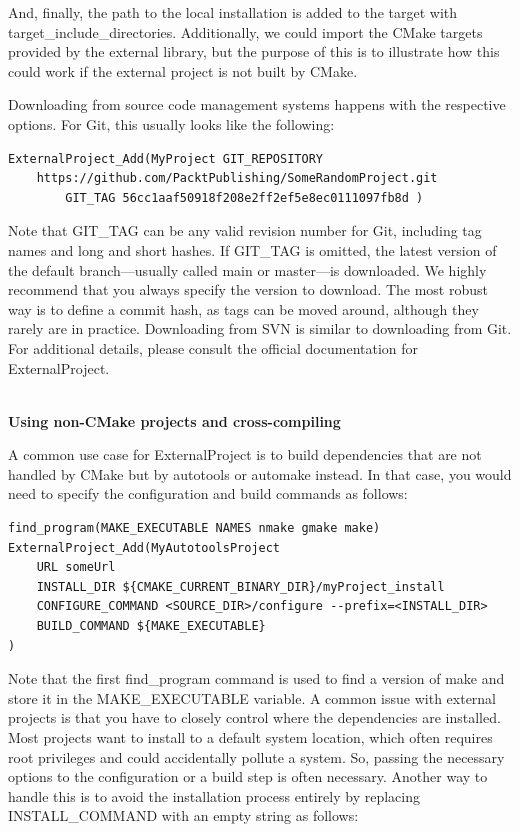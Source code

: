 And, finally, the path to the local installation is added to the target with target\_include\_directories. Additionally, we could import the CMake targets provided by the external library, but the purpose of this is to illustrate how this could work if the external project is not built by CMake.

Downloading from source code management systems happens with the respective options. For Git, this usually looks like the following:

\begin{lstlisting}[style=styleCMake]
ExternalProject_Add(MyProject GIT_REPOSITORY
	https://github.com/PacktPublishing/SomeRandomProject.git
		GIT_TAG 56cc1aaf50918f208e2ff2ef5e8ec0111097fb8d )
\end{lstlisting}

Note that GIT\_TAG can be any valid revision number for Git, including tag names and long and short hashes. If GIT\_TAG is omitted, the latest version of the default branch—usually called main or master—is downloaded. We highly recommend that you always specify the version to download. The most robust way is to define a commit hash, as tags can be moved around, although they rarely are in practice. Downloading from SVN is similar to downloading from Git. For additional details, please consult the official documentation for ExternalProject.

\hspace*{\fill} \\ %
\noindent
\textbf{Using non-CMake projects and cross-compiling}

A common use case for ExternalProject is to build dependencies that are not handled by CMake but by autotools or automake instead. In that case, you would need to specify the configuration and build commands as follows:

\begin{lstlisting}[style=styleCMake]
find_program(MAKE_EXECUTABLE NAMES nmake gmake make)
ExternalProject_Add(MyAutotoolsProject
	URL someUrl
	INSTALL_DIR ${CMAKE_CURRENT_BINARY_DIR}/myProject_install
	CONFIGURE_COMMAND <SOURCE_DIR>/configure --prefix=<INSTALL_DIR>
	BUILD_COMMAND ${MAKE_EXECUTABLE}
)
\end{lstlisting}

Note that the first find\_program command is used to find a version of make and store it in the MAKE\_EXECUTABLE variable. A common issue with external projects is that you have to closely control where the dependencies are installed. Most projects want to install to a default system location, which often requires root privileges and could accidentally pollute a system. So, passing the necessary options to the configuration or a build step is often necessary. Another way to handle this is to avoid the installation process entirely by replacing INSTALL\_COMMAND with an empty string as follows:

